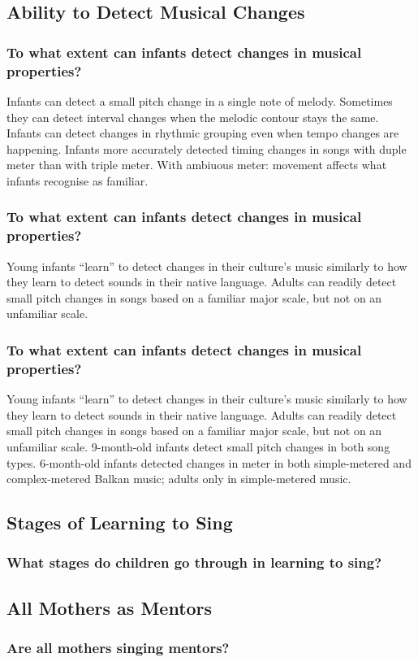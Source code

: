 \documentclass{beamer}
\begin{document}
\subsection*{Ability to Detect Musical Changes}
\begin{frame}
	\frametitle{To what extent can infants detect changes in musical properties?}
	Infants can detect a small pitch change in a single note of melody.
	Sometimes they can detect interval changes when the melodic contour stays the same.
	Infants can detect changes in rhythmic grouping even when tempo changes are happening.
	Infants more accurately detected timing changes in songs with duple meter than with triple meter.
	With ambiuous meter: movement affects what infants recognise as familiar.
\end{frame}

\begin{frame}
	\frametitle{To what extent can infants detect changes in musical properties?}
	Young infants ``learn'' to detect changes in their culture's music similarly to how they learn to detect sounds in their native language.
	Adults can readily detect small pitch changes in songs based on a familiar major scale, but not on an unfamiliar scale.
\end{frame}

\begin{frame}
	\frametitle{To what extent can infants detect changes in musical properties?}
	Young infants ``learn'' to detect changes in their culture's music similarly to how they learn to detect sounds in their native language.
	Adults can readily detect small pitch changes in songs based on a familiar major scale, but not on an unfamiliar scale.
	9-month-old infants detect small pitch changes in both song types.
	6-month-old infants detected changes in meter in both simple-metered and complex-metered Balkan music; adults only in simple-metered music.
\end{frame}

\subsection*{Stages of Learning to Sing}
\begin{frame}
	\frametitle{What stages do children go through in learning to sing?}
\end{frame}

\subsection*{All Mothers as Mentors}
\begin{frame}
	\frametitle{Are all mothers singing mentors?}
\end{frame}
\end{document}
